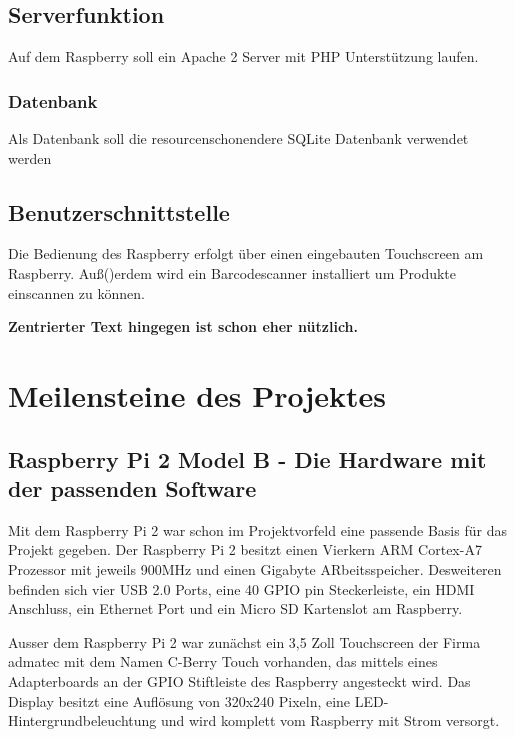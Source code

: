 \documentclass[11pt,a4paper]{article} %
\begin{document}
\subsection{Serverfunktion}
Auf dem Raspberry soll ein Apache 2 Server mit PHP Unterst\"utzung laufen.
\subsubsection{Datenbank}
Als Datenbank soll die resourcenschonendere SQLite Datenbank verwendet werden

\subsection{Benutzerschnittstelle}
Die Bedienung des Raspberry erfolgt \"uber einen eingebauten Touchscreen am Raspberry. Au\ss()erdem wird ein Barcodescanner installiert um Produkte einscannen zu k\"onnen.

\begin{center}
\begin{large}
\textbf{Zentrierter Text hingegen ist schon eher nützlich.}
\end{large}
\end{center}


\section{Meilensteine des Projektes}
\label{Umbrueche}

\subsection{Raspberry Pi 2 Model B - Die Hardware mit der passenden Software}
Mit dem Raspberry Pi 2 war schon im Projektvorfeld eine passende Basis f\"ur das Projekt gegeben. Der Raspberry Pi 2 besitzt einen Vierkern ARM Cortex-A7 Prozessor mit jeweils 900MHz und einen Gigabyte ARbeitsspeicher. Desweiteren befinden sich vier USB 2.0 Ports, eine 40 GPIO pin Steckerleiste, ein HDMI Anschluss, ein Ethernet Port und ein Micro SD Kartenslot am Raspberry.
\par
Ausser dem Raspberry Pi 2 war zun\"achst ein 3,5 Zoll Touchscreen der Firma admatec mit dem Namen C-Berry Touch vorhanden, das mittels eines Adapterboards an der GPIO Stiftleiste des Raspberry angesteckt wird. Das Display besitzt eine Aufl\"osung von 320x240 Pixeln, eine LED- Hintergrundbeleuchtung und wird komplett vom Raspberry mit Strom versorgt.
\end{document}

